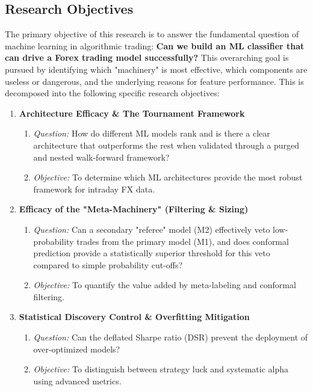 \documentclass[12pt, a4paper]{article}
\begin{document}
\subsection{Research Objectives}\label{sec:research_objectives}

The primary objective of this research is to answer the fundamental question of machine learning in algorithmic trading: 
\textbf{Can we build an ML classifier that can drive a Forex trading model successfully?}
This overarching goal is pursued by identifying which "machinery" is most effective, which components are useless or dangerous, 
and the underlying reasons for feature performance. This is decomposed into the following specific research objectives:

\begin{enumerate}
  \item \textbf{Architecture Efficacy \& The Tournament Framework}
  \begin{enumerate}
    \item \textit{Question:} How do different ML models rank and is there a clear architecture that outperforms the rest 
    when validated through a purged and nested walk-forward framework?
    \item \textit{Objective:} To determine which ML architectures provide the most robust framework for intraday FX data.
  \end{enumerate}
  

  \item \textbf{Efficacy of the "Meta-Machinery" (Filtering \& Sizing)}
  \begin{enumerate}
    \item \textit{Question:} Can a secondary "referee" model (M2) effectively veto low-probability trades from the primary model (M1), 
    and does conformal prediction provide a statistically superior threshold for this veto compared to simple probability cut-offs?
    \item \textit{Objective:} To quantify the value added by meta-labeling and conformal filtering.
  \end{enumerate}


  \item \textbf{Statistical Discovery Control \& Overfitting Mitigation}
  \begin{enumerate}
    \item \textit{Question:} Can the deflated Sharpe ratio (DSR) prevent the deployment of over-optimized models?
    \item \textit{Objective:} To distinguish between strategy luck and systematic alpha using advanced metrics.
  \end{enumerate}
  


\end{enumerate}
\end{document}
